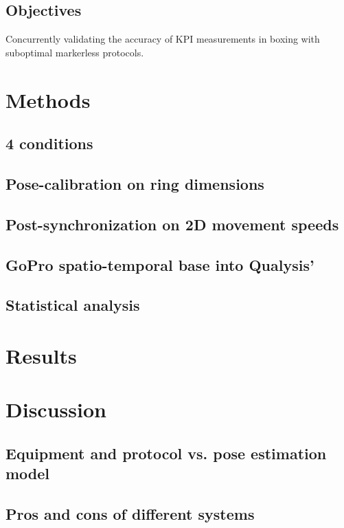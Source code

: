 \subsection{Objectives}

Concurrently validating the accuracy of KPI measurements in boxing with suboptimal markerless protocols.


\section{Methods}
\subsection{4 conditions}
\blindtext

\subsection{Pose-calibration on ring dimensions}
\blindtext

\subsection{Post-synchronization on 2D movement speeds}
\blindtext

\subsection{GoPro spatio-temporal base into Qualysis'}
\blindtext

\subsection{Statistical analysis}
\blindtext


\section{Results}
\blindtext


\section{Discussion}
\subsection{Equipment and protocol vs. pose estimation model}
\blindtext

\subsection{Pros and cons of different systems}


